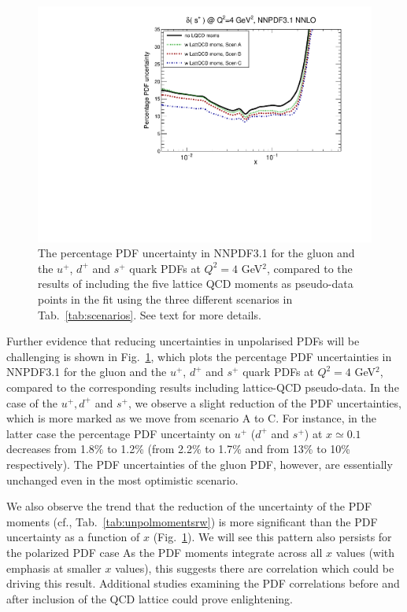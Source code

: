 \begin{figure}[!t]
\includegraphics[scale=0.45]{plots/xsp-unpol-lattice-relerr.pdf}
\caption{\small The percentage PDF uncertainty in NNPDF3.1  
  for the gluon and the $u^+$, $d^+$ and $s^+$ quark PDFs at
  $Q^2=4$ GeV$^2$,
  compared to the results of including the five lattice
  QCD moments as pseudo-data points in the fit using the three
  different scenarios in  Tab.~\ref{tab:scenarios}.
See text for more details.
}    
\label{fig:impactUnpol}
\end{figure}

Further evidence that reducing uncertainties in unpolarised PDFs will be 
challenging is shown in Fig.~\ref{fig:impactUnpol}, which plots the percentage 
PDF uncertainties in NNPDF3.1 for the gluon and the
$u^+$, $d^+$ and $s^+$ quark PDFs at $Q^2=4$ GeV$^2$, compared to the 
corresponding results including lattice-QCD pseudo-data.
%
In the case of the $u^+,d^+$ and $s^+$, we observe a slight reduction
of the PDF uncertainties, which is more marked as we move
from scenario A to C.
%
For instance, in the latter case the percentage PDF
uncertainty on $u^+$ ($d^+$ and $s^+$) at $x\simeq 0.1$
decreases from 1.8\% to 1.2\% (from 2.2\% to 1.7\% and from 13\% to 10\% respectively).
%
The PDF uncertainties of the gluon PDF, however,
are essentially unchanged even in the most optimistic scenario.

% 

We also observe the trend that the  reduction of the uncertainty 
of the PDF moments (cf.,  Tab.~\ref{tab:unpolmomentsrw})
is  more significant than the PDF uncertainty as a function of $x$  (Fig.~\ref{fig:impactUnpol}).
We will see this pattern also persists for the polarized PDF case
%
As the PDF moments integrate across all $x$  values (with emphasis at smaller $x$ values), 
this suggests there are correlation which could be driving this result. 
Additional studies examining the PDF correlations before and after inclusion of the 
QCD lattice could prove enlightening. 

